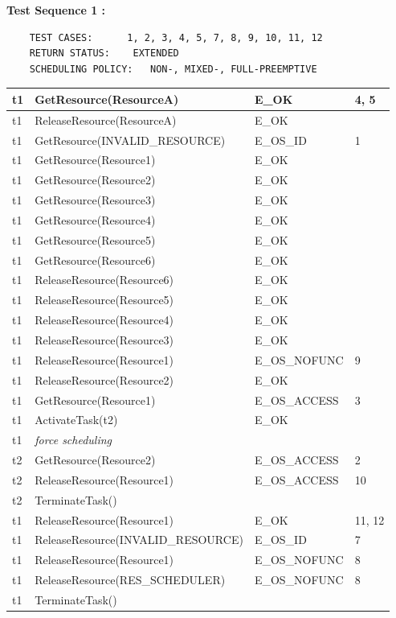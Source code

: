 \documentclass[10pt]{article}
\newlength{\Li}\settowidth{\Li}{Running}
\newlength{\Lii}\setlength{\Lii}{7cm}
\newlength{\Liiii}\setlength{\Liiii}{0.9cm}
\newlength{\Liii}\setlength{\Liii}{\textwidth} \addtolength{\Liii}{-\Li} \addtolength{\Liii}{-\Lii} \addtolength{\Liii}{-\Liiii}
\begin{document}
	\textbf{Test Sequence 1 :} 
	\begin{lstlisting}
	TEST CASES:		 1, 2, 3, 4, 5, 7, 8, 9, 10, 11, 12
	RETURN STATUS:	  EXTENDED 
	SCHEDULING POLICY:   NON-, MIXED-, FULL-PREEMPTIVE
	\end{lstlisting}
	

	\begin{supertabular}{|p{\Li}|p{\Lii}|p{\Liii}|p{\Liiii}|} \hline 
	t1 & GetResource(ResourceA) 				& E\_OK			& 4, 5 \\ \hline 
	t1 & ReleaseResource(ResourceA) 			& E\_OK			& \\ \hline 
	t1 & GetResource(INVALID\_RESOURCE)	& E\_OS\_ID 		& 1 \\ \hline
	t1 & GetResource(Resource1) 				& E\_OK 			& \\ \hline
	t1 & GetResource(Resource2) 				& E\_OK 			& \\ \hline 
	t1 & GetResource(Resource3) 				& E\_OK  			& \\ \hline
	t1 & GetResource(Resource4) 				& E\_OK  			& \\ \hline
	t1 & GetResource(Resource5) 				& E\_OK  			& \\ \hline
	t1 & GetResource(Resource6) 				& E\_OK 			& \\ \hline
	t1 & ReleaseResource(Resource6) 			& E\_OK 			& \\ \hline
	t1 & ReleaseResource(Resource5) 			& E\_OK  			& \\ \hline
	t1 & ReleaseResource(Resource4) 			& E\_OK  			& \\ \hline
	t1 & ReleaseResource(Resource3) 			& E\_OK  			& \\ \hline
	t1 & ReleaseResource(Resource1) 			& E\_OS\_NOFUNC	& 9 \\ \hline 
	t1 & ReleaseResource(Resource2) 			& E\_OK 			& \\ \hline 
	t1 & GetResource(Resource1) 				& E\_OS\_ACCESS	& 3 \\ \hline
	
	t1& ActivateTask(t2)						& E\_OK			& \\ \hline
	t1 & \textit{force scheduling}				& 		 		& \\ \hline 
	
	t2 & GetResource(Resource2) 				& E\_OS\_ACCESS	& 2 \\ \hline
	t2 & ReleaseResource(Resource1) 			& E\_OS\_ACCESS 	& 10 \\ \hline
	t2 & TerminateTask()					& 				&  \\ \hline

	t1 & ReleaseResource(Resource1) 			& E\_OK		 	& 11, 12 \\ \hline
	t1 & ReleaseResource(INVALID\_RESOURCE) & E\_OS\_ID 		& 7 \\ \hline
	t1 & ReleaseResource(Resource1) 			& E\_OS\_NOFUNC 	& 8 \\ \hline
	t1 & ReleaseResource(RES\_SCHEDULER)	& E\_OS\_NOFUNC 	& 8 \\ \hline
	t1 & TerminateTask() 					& 				&  \\ \hline
	\end{supertabular} \\
	
\end{document}
